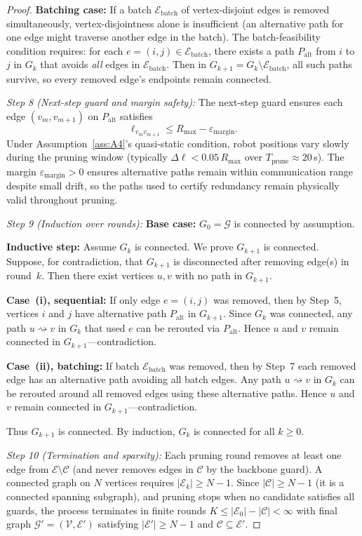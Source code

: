 \documentclass[conference]{IEEEconf}
\theoremstyle{plain}
\begin{document}
\begin{proof}
\textbf{Batching case:} If a batch $\mathcal{E}_{\mathrm{batch}}$ of vertex-disjoint edges is removed simultaneously, vertex-disjointness alone is insufficient (an alternative path for one edge might traverse another edge in the batch).
The batch-feasibility condition requires: for each $e=(i,j)\in\mathcal{E}_{\mathrm{batch}}$, there exists a path $P_{\mathrm{alt}}$ from $i$ to $j$ in $G_k$ that avoids \emph{all} edges in $\mathcal{E}_{\mathrm{batch}}$.
Then in $G_{k+1}=G_k\setminus\mathcal{E}_{\mathrm{batch}}$, all such paths survive, so every removed edge's endpoints remain connected.

\emph{Step 8 (Next-step guard and margin safety):}
The next-step guard ensures each edge $(v_m,v_{m+1})$ on $P_{\mathrm{alt}}$ satisfies
\[
\ell_{v_m v_{m+1}} \le R_{\max}-\varepsilon_{\mathrm{margin}}.
\]
Under Assumption~\ref{ass:A4}'s quasi-static condition, robot positions vary slowly during the pruning window (typically $\Delta\ell<0.05\,R_{\max}$ over $T_{\mathrm{prune}}\approx 20$\,s).
The margin $\varepsilon_{\mathrm{margin}}>0$ ensures alternative paths remain within communication range despite small drift, so the paths used to certify redundancy remain physically valid throughout pruning.

\emph{Step 9 (Induction over rounds):}
\textbf{Base case:} $G_0=\mathcal{G}$ is connected by assumption.

\textbf{Inductive step:} Assume $G_k$ is connected. We prove $G_{k+1}$ is connected.
Suppose, for contradiction, that $G_{k+1}$ is disconnected after removing edge(s) in round~$k$.
Then there exist vertices $u,v$ with no path in $G_{k+1}$.

\textbf{Case~(i), sequential:} If only edge $e=(i,j)$ was removed, then by Step~5, vertices $i$ and $j$ have alternative path $P_{\mathrm{alt}}$ in $G_{k+1}$.
Since $G_k$ was connected, any path $u\rightsquigarrow v$ in $G_k$ that used $e$ can be rerouted via $P_{\mathrm{alt}}$.
Hence $u$ and $v$ remain connected in $G_{k+1}$—contradiction.

\textbf{Case~(ii), batching:} If batch $\mathcal{E}_{\mathrm{batch}}$ was removed, then by Step~7 each removed edge has an alternative path avoiding all batch edges.
Any path $u\rightsquigarrow v$ in $G_k$ can be rerouted around all removed edges using these alternative paths.
Hence $u$ and $v$ remain connected in $G_{k+1}$—contradiction.

Thus $G_{k+1}$ is connected. By induction, $G_k$ is connected for all $k\ge 0$.

\emph{Step 10 (Termination and sparsity):}
Each pruning round removes at least one edge from $\mathcal{E}\setminus\mathcal{C}$ (and never removes edges in $\mathcal{C}$ by the backbone guard).
A connected graph on $N$ vertices requires $|\mathcal{E}_k|\ge N-1$.
Since $|\mathcal{C}|\ge N-1$ (it is a connected spanning subgraph), and pruning stops when no candidate satisfies all guards, the process terminates in finite rounds $K\le|\mathcal{E}_0|-|\mathcal{C}|<\infty$ with final graph $\mathcal{G}'=(\mathcal{V},\mathcal{E}')$ satisfying $|\mathcal{E}'|\ge N-1$ and $\mathcal{C}\subseteq\mathcal{E}'$.


\end{proof}
\end{document}
